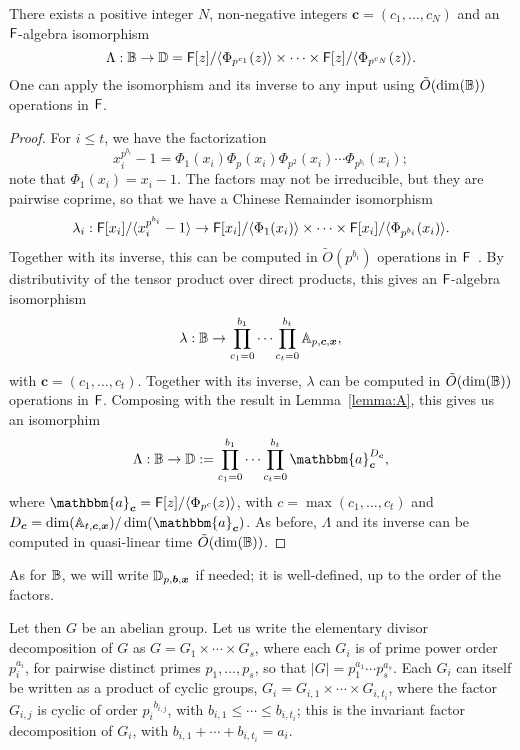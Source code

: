 \begin{lemma}\label{lemma:alg}
  There exists a positive integer $N$, non-negative integers
  $\boldsymbol{c}=(c_1,\dots,c_N)$ and  an
  ${\mathsf{F}}$-algebra isomorphism 
  $$\Lambda: \mathbb{B} \to \mathbb{D}= {\mathsf{F}}[z]/\langle \Phi_{p^{c_1}}(z) \rangle \times \cdots \times {\mathsf{F}}[z]/\langle \Phi_{p^{c_N}}(z)\rangle.$$
  One can apply the isomorphism and its inverse to any 
  input using $\tilde{O}(\dim(\mathbb{B}))$ operations in ${\mathsf{F}}$.
\end{lemma}
\begin{proof}
For $i \le t$, we have the factorization
$$x_i^{p^{b_i}}-1 = \Phi_1(x_i) \Phi_p(x_i) \Phi_{p^2}(x_i) \cdots
\Phi_{p^{b_i}}(x_i);$$ note that $\Phi_1(x_i)=x_i-1$.  The factors may
not be irreducible, but they are pairwise coprime, so that we have a
Chinese Remainder isomorphism
\[
  \lambda_i: {\mathsf{F}}[x_i]/\langle x_i^{p^{b_i}}-1 \rangle \to {\mathsf{F}}[x_i]/\langle \Phi_1(x_i)\rangle
  \times \cdots \times  {\mathsf{F}}[x_i]/\langle \Phi_{p^{b_i}}(x_i)\rangle.
\]
Together with its inverse, this can be computed  
in $\tilde{O}(p^{b_i})$ operations in ${\mathsf{F}}$~\cite[Chapter~10]{vzGathen13}. By distributivity of the tensor
product over direct products, 
this gives an ${\mathsf{F}}$-algebra isomorphism
$$\lambda: \mathbb{B} \to \prod_{c_1=0}^{b_1} \cdots \prod_{c_t=0}^{b_t} \mathbb{A}_{p,\boldsymbol{c},\boldsymbol{x}},$$
with $\boldsymbol{c}=(c_1,\dots,c_t)$. Together with its inverse, 
$\lambda$ can be computed in $\tilde{O}(\dim(\mathbb{B}))$ operations in ${\mathsf{F}}$.
Composing with the result in Lemma~\ref{lemma:A}, this gives
us an isomorphim
$$\Lambda: \B \to \D:=\prod_{c_1=0}^{b_1} \cdots \prod_{c_t=0}^{b_t}
\mathbbm{a}_{\boldsymbol{c}}^{D_{\boldsymbol{c}}},$$ where
$\mathbbm{a}_{\boldsymbol{c}} = \F[z]/\langle \Phi_{p^c}(z)\rangle$,
with $c =\max(c_1,\dots,c_t)$ and $D_{\boldsymbol{c}} =
\dim(\A_{t,\boldsymbol{c},\boldsymbol{x}})/\dim(\mathbbm{a}_{\boldsymbol{c}})$. As
before, $\Lambda$ and its inverse can be computed in quasi-linear time
$\tilde{O}(\dim(\mathbb{B}))$.
\end{proof}
As for $\mathbb{B}$, we will write $\mathbb{D}_{p,\boldsymbol{b},\boldsymbol{x}}$ if needed; it is
well-defined, up to the order of the factors.

\smallskip

 Let then $G$ be an abelian group.  Let us
write the elementary divisor decomposition of $G$ as $G = G_1 \times
\cdots \times G_s$, where each $G_i$ is of prime power order
$p_i^{a_i}$, for pairwise distinct primes $p_1,\dots,p_s$, so that
$|G| = p_1^{a_1} \cdots p_s^{a_s}$. Each $G_i$ can itself be written
as a product of cyclic groups, $G_i = G_{i,1} \times \cdots \times
G_{i,t_i}$, where the factor $G_{i,j}$ is cyclic of order
${p_i}^{b_{i,j}}$, with $b_{i,1} \le \cdots \le b_{i,t_i}$; this is
the invariant factor decomposition of $G_i$, with $b_{i,1} + \cdots +
b_{i,t_i} = a_i$.

